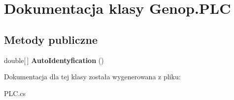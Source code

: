 \hypertarget{classGenop_1_1PLC}{}\section{Dokumentacja klasy Genop.\+P\+LC}
\label{classGenop_1_1PLC}
\subsection*{Metody publiczne}
\begin{DoxyCompactItemize}
\item 
double\mbox{[}$\,$\mbox{]} {\bfseries Auto\+Identyfication} ()\hypertarget{classGenop_1_1PLC_afa849d2eba7ea7ba9f2c36364e069c45}{}\label{classGenop_1_1PLC_afa849d2eba7ea7ba9f2c36364e069c45}

\end{DoxyCompactItemize}


Dokumentacja dla tej klasy została wygenerowana z pliku\+:\begin{DoxyCompactItemize}
\item 
P\+L\+C.\+cs\end{DoxyCompactItemize}
